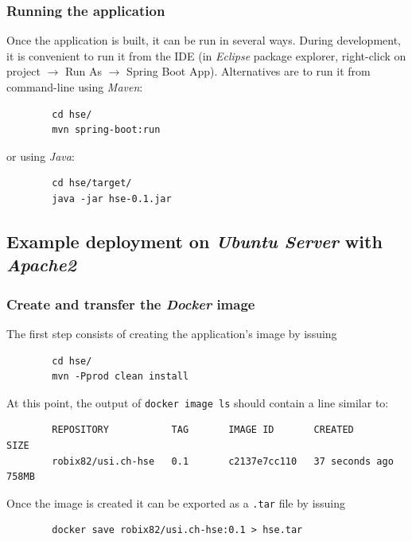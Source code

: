 \documentclass[a4paper]{usiinfbachelorproject}
\begin{document}
\begin{appendices}
        \subsubsection{Running the application}

        Once the application is built, it can be run in several ways. During development, it is convenient to run it from the IDE (in
        \emph{Eclipse} package explorer, right-click on project $\rightarrow$ Run As $\rightarrow$ Spring Boot App). Alternatives are to run it from command-line using \emph{Maven}:
        \begin{verbatim}
        cd hse/
        mvn spring-boot:run
        \end{verbatim}
        or using \emph{Java}:

        \begin{verbatim}
        cd hse/target/
        java -jar hse-0.1.jar
        \end{verbatim}

        \subsection{Example deployment on \emph{Ubuntu Server} with \emph{Apache2}}

        \subsubsection{Create and transfer the \emph{Docker} image}

        The first step consists of creating the application's image by issuing

        \begin{verbatim}
        cd hse/
        mvn -Pprod clean install
        \end{verbatim}

        At this point, the output of \texttt{docker image ls} should contain a line similar to:

        \begin{verbatim}
        REPOSITORY           TAG       IMAGE ID       CREATED             SIZE
        robix82/usi.ch-hse   0.1       c2137e7cc110   37 seconds ago      758MB
        \end{verbatim}

        Once the image is created it can be exported as a \texttt{.tar} file by issuing

        \begin{verbatim}
        docker save robix82/usi.ch-hse:0.1 > hse.tar
        \end{verbatim}


\end{appendices}
\end{document}
